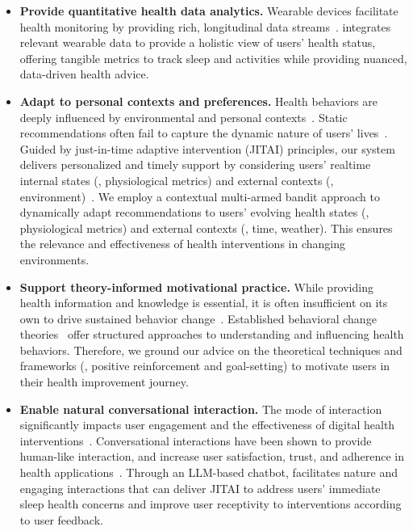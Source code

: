 \begin{itemize}
     \item \textbf{Provide quantitative health data analytics.} 
     Wearable devices facilitate health monitoring by providing rich, longitudinal data streams~\cite{piwek2016rise}. \name{} integrates relevant wearable data to provide a holistic view of users' health status, offering tangible metrics to track sleep and activities while providing nuanced, data-driven health advice.
 
    \item \textbf{Adapt to personal contexts and preferences.} 
    Health behaviors are deeply influenced by environmental and personal contexts~\cite{sallis2015ecological}.
    Static recommendations often fail to capture the dynamic nature of users' lives~\cite{yardley2016understanding}.
    Guided by just-in-time adaptive intervention (JITAI) principles, our system delivers personalized and timely support by considering users' realtime internal states (\eg, physiological metrics) and external contexts (\eg, environment)~\cite{nahum2018just}.
    We employ a contextual multi-armed bandit approach to dynamically adapt recommendations to users' evolving health states (\eg, physiological metrics) and external contexts (\eg, time, weather).
    This ensures the relevance and effectiveness of health interventions in changing environments. 

    \item \textbf{Support theory-informed motivational practice.} 
    While providing health information and knowledge is essential, it is often insufficient on its own to drive sustained behavior change~\cite{kelly2016changing}.
    Established behavioral change theories~\cite{michie2013behavior, atkins2017guide} offer structured approaches to understanding and influencing health behaviors.
    Therefore, we ground our  advice on the theoretical techniques and frameworks (\eg, positive reinforcement and goal-setting) to motivate users in their health improvement journey.

    \item \textbf{Enable natural conversational interaction.} 
    The mode of interaction significantly impacts user engagement and the effectiveness of digital health interventions~\cite{bickmore2005establishing}. 
    Conversational interactions have been shown to provide human-like interaction, and increase user satisfaction, trust, and adherence in health applications~\cite{laranjo2018conversational, kocaballi2019personalization}. Through an LLM-based chatbot, \name{} facilitates nature and engaging interactions that can deliver JITAI to address users' immediate sleep health concerns and improve user receptivity to interventions according to user feedback.
   
\end{itemize}

